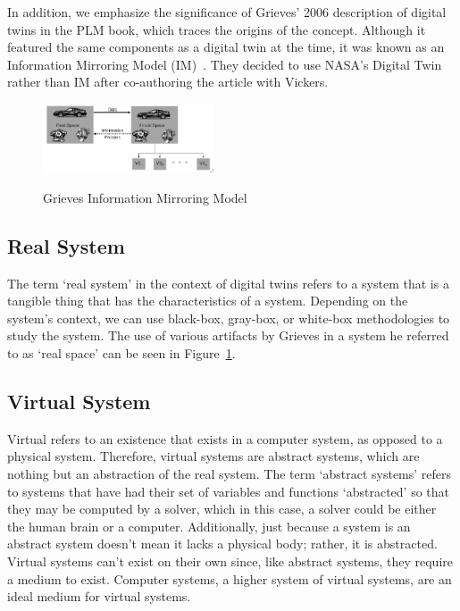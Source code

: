\documentclass[9pt,conference]{IEEEtran}
\begin{document}
    In addition, we emphasize the significance of Grieves' 2006 description of digital twins in the PLM book,
    which traces the origins of the concept. Although it featured the same components as a digital twin at the time, it was known as an Information Mirroring Model (IM)~\cite{GrievesPLMBook}. 
    They decided to use NASA's Digital Twin rather than IM after co-authoring the article with Vickers.

    \begin{figure}
        \centering
        \includegraphics[width =0.45\textwidth]{GrievesInformationMirroringModel.png}
        \caption{Grieves Information Mirroring Model}\label{fig:GrievesInformationMirroringModel}
        \cite{GrievesPLMBook}
    \end{figure}

    \subsection*{Real System}

    The term `real system' in the context of digital twins refers to a system that is a tangible thing that has the characteristics of a system. Depending on the system's context, we can use black-box, gray-box, or white-box methodologies to study the system. 
    The use of various artifacts by Grieves in a system he referred to as `real space' can be seen in Figure~\ref{fig:GrievesInformationMirroringModel}.

    \subsection*{Virtual System}
    Virtual refers to an existence that exists in a computer system, as opposed to a physical system. Therefore, virtual systems are abstract systems, which are nothing but an abstraction of the real system.
    The term `abstract systems' refers to systems that have had their set of variables and functions `abstracted' so that they may be computed by a solver, which in this case, a solver could be either the human brain or a computer.
    Additionally, just because a system is an abstract system doesn't mean it lacks a physical body; rather, it is abstracted. 
    Virtual systems can't exist on their own since, like abstract systems, they require a medium to exist. Computer systems, a higher system of virtual systems, are an ideal medium for virtual systems.
    
\end{document}
